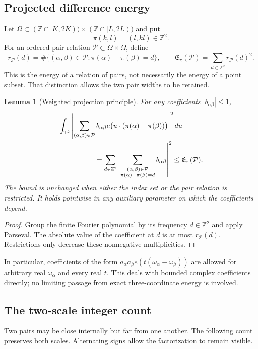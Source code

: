 \documentclass[11pt,reqno]{amsart}
\numberwithin{equation}{section}
\newtheorem{lemma}[lemma]{Lemma}
\theoremstyle{definition}
\theoremstyle{remark}
\newcommand{\T}{\mathbb T}
\newcommand{\Z}{\mathbb Z}
\begin{document}
\subsection{Projected difference energy}
Let $\Omega\subset(\Z\cap[K,2K))\times(\Z\cap[L,2L))$ and put
\[
 \pi(k,l)=(l,kl)\in\Z^2.
\]
For an ordered-pair relation $\mathcal P\subset\Omega\times\Omega$, define
\begin{equation}\label{eq:projectedenergy}
 r_{\mathcal P}(d)=\#\{(\alpha,\beta)\in\mathcal P:
              \pi(\alpha)-\pi(\beta)=d\},\qquad
 \mathfrak E_\pi(\mathcal P)=\sum_{d\in\Z^2}r_{\mathcal P}(d)^2.
\end{equation}
This is the energy of a relation of pairs, not necessarily the energy of a point subset.
That distinction allows the two pair widths to be retained.

\begin{lemma}[Weighted projection principle]\label{lem:projection}
For any coefficients $|b_{\alpha\beta}|\le1$,
\begin{align}
 &\int_{\T^2}\left|
  \sum_{(\alpha,\beta)\in\mathcal P}
    b_{\alpha\beta}e\bigl(u\cdot(\pi(\alpha)-\pi(\beta))\bigr)
                  \right|^2du \notag\\
 &\hspace{18mm}=
 \sum_{d\in\Z^2}\left|
   \sum_{\substack{(\alpha,\beta)\in\mathcal P\\
                   \pi(\alpha)-\pi(\beta)=d}}b_{\alpha\beta}
                  \right|^2
 \le \mathfrak E_\pi(\mathcal P).
 \label{eq:projectionprinciple}
\end{align}
The bound is unchanged when either the index set or the pair relation is restricted.
It holds pointwise in any auxiliary parameter on which the coefficients depend.
\end{lemma}
\begin{proof}
Group the finite Fourier polynomial by its frequency $d\in\Z^2$ and apply Parseval.
The absolute value of the coefficient at $d$ is at most $r_{\mathcal P}(d)$.
Restrictions only decrease these nonnegative multiplicities.
\end{proof}
In particular, coefficients of the form
$a_\alpha\overline{a_\beta}e(t(\omega_\alpha-\omega_\beta))$
are allowed for arbitrary real $\omega_\alpha$ and every real $t$.
This deals with bounded complex coefficients directly; no limiting passage from exact
three-coordinate energy is involved.

\subsection{The two-scale integer count}
Two pairs may be close internally but far from one another. The following count preserves
both scales. Alternating signs allow the factorization to remain visible.
\end{document}

